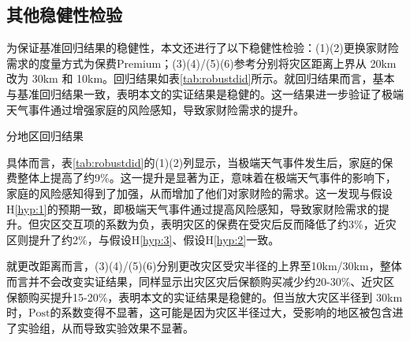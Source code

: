\subsection{其他稳健性检验}

为保证基准回归结果的稳健性，本文还进行了以下稳健性检验：(1)(2)更换家财险需求的度量方式为保费Premium；(3)(4)/(5)(6)参考\citet{alok2020fund}分别将灾区距离上界从 20km 改为 30km 和 10km。回归结果如表\ref{tab:robustdid}所示。就回归结果而言，基本与基准回归结果一致，表明本文的实证结果是稳健的。这一结果进一步验证了极端天气事件通过增强家庭的风险感知，导致家财险需求的提升。
\begin{table}
    \centering
    \caption{分地区回归结果}\label{tab:robustdid}
    
\end{table}

具体而言，表\ref{tab:robustdid}的(1)(2)列显示，当极端天气事件发生后，家庭的保费整体上提高了约9\%。这一提升是显著为正，意味着在极端天气事件的影响下，家庭的风险感知得到了加强，从而增加了他们对家财险的需求。这一发现与假设H\ref{hyp:1}的预期一致，即极端天气事件通过提高风险感知，导致家财险需求的提升。但灾区交互项的系数为负，表明灾区的保费在受灾后反而降低了约3\%，近灾区则提升了约2\%，与假设H\ref{hyp:3}、假设H\ref{hyp:2}一致。

就更改距离而言，(3)(4)/(5)(6)分别更改灾区受灾半径的上界至10km/30km，整体而言并不会改变实证结果，同样显示出灾区灾后保额购买减少约20-30\%、近灾区保额购买提升15-20\%，表明本文的实证结果是稳健的。但当放大灾区半径到 30km 时，$\text{Post}$的系数变得不显著，这可能是因为灾区半径过大，受影响的地区被包含进了实验组，从而导致实验效果不显著。
